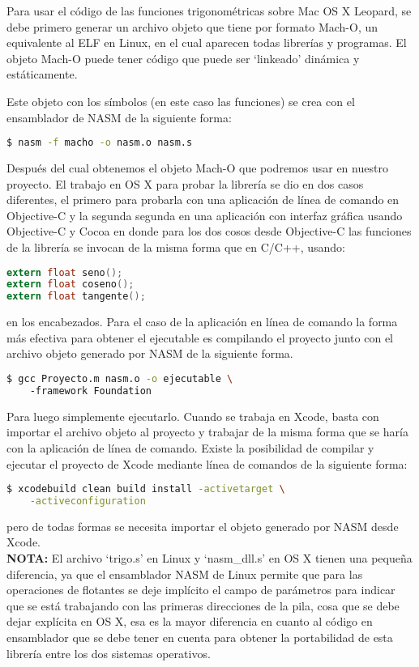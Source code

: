 %
%


%

Para usar el código de las funciones trigonométricas sobre Mac OS X Leopard, se debe primero generar un archivo objeto que tiene por formato Mach-O, un equivalente al ELF en Linux, en el cual aparecen todas librerías y programas. El objeto Mach-O puede tener código que puede ser `linkeado' dinámica y estáticamente.

Este objeto con los símbolos (en este caso las funciones) se crea con el ensamblador de NASM de la siguiente forma: 
\begin{lstlisting}[language=bash]
 $ nasm -f macho -o nasm.o nasm.s 
\end{lstlisting}
Después del cual obtenemos el objeto Mach-O que podremos usar en nuestro proyecto. El trabajo en OS X para probar la librería se dio en dos casos diferentes, el primero para probarla con una aplicación de línea de comando en Objective-C y la segunda segunda en una aplicación con interfaz gráfica usando Objective-C y Cocoa en donde para los dos cosos desde Objective-C las funciones de la librería se invocan de la misma forma que en C/C++, usando:\begin{lstlisting}[language=C]
extern float seno();
extern float coseno();
extern float tangente();
\end{lstlisting}
en los encabezados.
Para el caso de la aplicación en línea de comando la forma más efectiva para obtener el ejecutable es compilando el proyecto junto con el archivo objeto generado por NASM de la siguiente forma.
\begin{lstlisting}[language=bash]
 $ gcc Proyecto.m nasm.o -o ejecutable \ 
 	-framework Foundation
\end{lstlisting}
Para luego simplemente ejecutarlo.
Cuando se trabaja en Xcode, basta con importar el archivo objeto al proyecto y trabajar de la misma forma que se haría con la aplicación de línea de comando.
Existe la posibilidad de compilar y ejecutar el proyecto de Xcode mediante línea de comandos de la siguiente forma:
\begin{lstlisting}[language=bash]
 $ xcodebuild clean build install -activetarget \
 	-activeconfiguration
\end{lstlisting}
pero de todas formas se necesita importar el objeto generado por NASM desde Xcode.\\

{\bfseries NOTA:} El archivo `trigo.s' en Linux y `nasm\_dll.s' en OS X tienen una pequeña diferencia, ya que el ensamblador NASM de Linux permite que para las operaciones de flotantes se deje implícito el campo de parámetros para indicar que se está trabajando con las primeras direcciones de la pila, cosa que se debe dejar explícita en OS X, esa es la mayor diferencia en cuanto al código en ensamblador que se debe tener en cuenta para obtener la portabilidad de esta librería entre los dos sistemas operativos.

%
